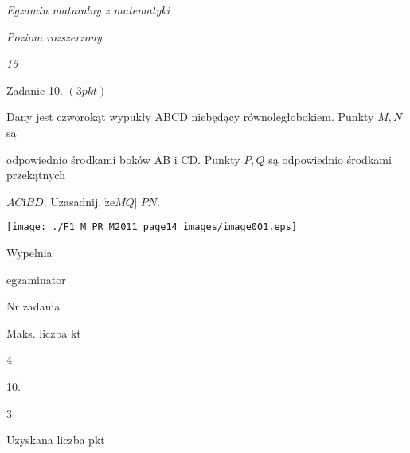 \documentclass[a4paper,12pt]{article}
\begin{document}
{\it Egzamin maturalny z matematyki}

{\it Poziom rozszerzony}

{\it 15}

Zadanie 10. $(3pkt)$

Dany jest czworokąt wypukły ABCD niebędący równoległobokiem. Punkty $M, N$ są

odpowiednio środkami boków AB $\mathrm{i}$ CD. Punkty $P, Q$ są odpowiednio środkami przekątnych

$AC\mathrm{i}BD$. Uzasadnij, $\dot{\mathrm{z}}\mathrm{e}MQ||PN.$
\begin{center}
\texttt{[image: ./F1\_M\_PR\_M2011\_page14\_images/image001.eps]}
\end{center}
Wypelnia

egzaminator

Nr zadania

Maks. liczba kt

4

10.

3

Uzyskana liczba pkt
\end{document}
